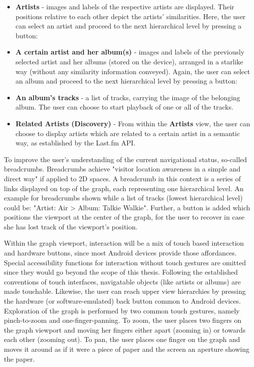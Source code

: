 \begin{itemize}
	\item \textbf{Artists} - images and labels of the respective artists are displayed. Their positions relative to each other depict the artists' similarities. Here, the user can select an artist and proceed to the next hierarchical level by pressing a button:
	\item \textbf{A certain artist and her album(s)} - images and labels of the previously selected artist and her albums (stored on the device), arranged in a starlike way (without any similarity information conveyed). Again, the user can select an album and proceed to the next hierarchical level by pressing a button:
	\item \textbf{An album's tracks} - a list of tracks, carrying the image of the belonging album. The user can choose to start playback of one or all of the tracks.
	\item \textbf{Related Artists (Discovery)} - From within the \textbf{Artists} view, the user can choose to display artists which are related to a certain artist in a semantic way, as established by the Last.fm API.
	
\end{itemize}

To improve the user's understanding of the current navigational status, so-called breadcrumbs. Breadcrumbs achieve "visitor location awareness in a simple and direct way" \cite{Tesoriero:2008:Breadcrumbs} if applied to 2D spaces. A breadcrumb in this context is a series of links displayed on top of the graph, each representing one hierarchical level. An example for breadcrumbs shown while a list of tracks (lowest hierarchical level) could be: "Artist: Air > Album: Talkie Walkie". Further, a button is added which positions the viewport at the center of the graph, for the user to recover in case she has lost track of the viewport's position.

Within the graph viewport, interaction will be a mix of touch based interaction and hardware buttons, since most Android devices provide those affordances. Special accessibility functions for interaction without touch gestures are omitted since they would go beyond the scope of this thesis.
Following the established conventions of touch interfaces, navigatable objects (like artists or albums) are made touchable. Likewise, the user can reach upper view hierarchies by pressing the hardware (or software-emulated) back button common to Android devices.
Exploration of the graph is performed by two common touch gestures, namely pinch-to-zoom and one-finger-panning. To zoom, the user places two fingers on the graph viewport and moving her fingers either apart (zooming in) or towards each other (zooming out). To pan, the user places one finger on the graph and moves it around as if it were a piece of paper and the screen an aperture showing the paper.

